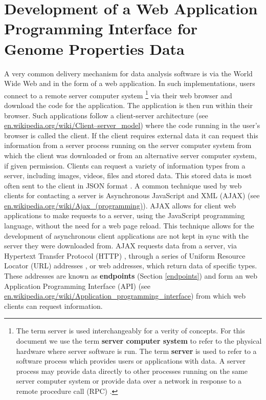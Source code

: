 \chapter{Development of a Web Application Programming Interface for Genome Properties Data}

A very common delivery mechanism for data analysis software is via the World Wide Web \cite{berners1994world} and in the form of a web application. In such implementations, users connect to a remote server computer system \footnote{The term server is used interchangeably for a verity of concepts. For this document we use the term \textbf{server computer system} to refer to the physical hardware where server software is run. The term \textbf{server} is used to refer to a software process which provides users or applications with data. A server process may provide data directly to other processes running on the same server computer system or provide data over a network in response to a remote procedure call (RPC) \cite{nelson1981remote}.} via their web browser and download the code for the application. The application is then run within their browser. Such applications follow a client-server architecture \cite{svobodova1985client} (see \href{en.wikipedia.org/wiki/Client–server\_model}{en.wikipedia.org/wiki/Client–server\_model}) where the code running in the user's browser is called the client. If the client requires external data it can request this information from a server process running on the server computer system from which the client was downloaded or from an alternative server computer system, if given permission. Clients can request a variety of information types from a server, including images, videos, files and stored data. This stored data is most often sent to the client in JSON format \cite{bray2014rfc}. A common technique used by web clients for contacting a server is Asynchronous JavaScript and XML (AJAX) \cite{garrett2005ajax} (see \href{en.wikipedia.org/wiki/Ajax\_(programming)}{en.wikipedia.org/wiki/Ajax\_(programming)}). AJAX allows for client web applications to make requests to a server, using the JavaScript \cite{flanagan2006javascript} programming language, without the need for a web page reload. This technique allows for the development of asynchronous client applications are not kept in sync with the server they were downloaded from. AJAX requests data from a server, via Hypertext Transfer Protocol (HTTP) \cite{fielding1999hypertext}, through a series of Uniform Resource Locator (URL) addresses \cite{berners1994rfc}, or web addresses, which return data of specific types. These addresses are known as \textbf{endpoints} (Section \ref{endpoints}) and form an web Application Programming Interface (API) (see \href{en.wikipedia.org/wiki/Application\_programming\_interface}{en.wikipedia.org/wiki/Application\_programming\_interface}) from which web clients can request information.

